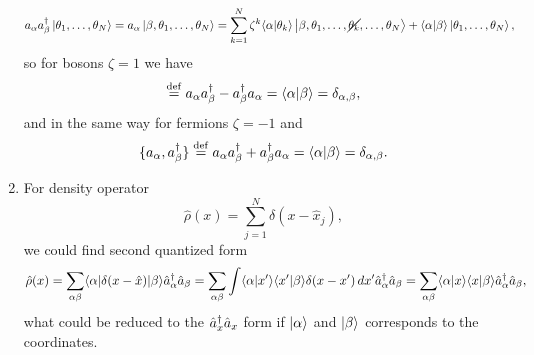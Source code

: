 \begin{enumerate}
\begin{align*}
		a_\alpha a_\beta\D \ket{\theta_1,\ldots,\theta_N} &= a_\alpha \ket{\beta,\theta_1,\ldots,\theta_N} = \sum_{k=1}^{N} \zeta^{k} \bk{\alpha}{\theta_k} \ket{\beta,\theta_1,\ldots,\cancel{\theta_k},\ldots,\theta_N} + \bk{\alpha}{\beta} \ket{\theta_1,\ldots,\theta_N},
	\end{align*}
	so for bosons $\zeta=1$ we have
	\begin{equation*}
		[a_\alpha, a_\beta\D] \overset{\mathrm{def}}{=} a_\alpha a_\beta\D - a_\beta\D a_\alpha = \bk{\alpha}{\beta} = \delta_{\alpha,\beta},
	\end{equation*}
	and in the same way for fermions $\zeta=-1$ and
	\begin{equation*}
		\{a_\alpha, a_\beta\D\} \overset{\mathrm{def}}{=} a_\alpha a_\beta\D + a_\beta\D a_\alpha = \bk{\alpha}{\beta} = \delta_{\alpha,\beta}.
	\end{equation*}
	\item For density operator 
	\begin{equation*}
		\hat{\rho}(x) = \sum_{j=1}^{N} \delta(x-\hat{x}_j),
	\end{equation*}
	we could find second quantized form
	\begin{equation*}
		\hat{\rho}(x) = \sum_{\alpha \beta} \bk{\alpha}[\delta(x-\hat{x})]{\beta} \hat{a}_\alpha\D \hat{a}_\beta = \sum_{\alpha \beta} \int
		\bk{\alpha}{x'} \bk{x'}{\beta} \delta(x-x') \d x' \hat{a}_\alpha\D \hat{a}_\beta = \sum_{\alpha \beta} \bk{\alpha}{x} \bk{x}{\beta} \hat{a}_\alpha\D \hat{a}_\beta,
	\end{equation*}
	what could be reduced to the $\hat{a}_x^{\dag} \hat{a}_x$ form if $\left| \alpha \right\rangle$ and $\left| \beta \right\rangle$ corresponds to the coordinates.
\end{enumerate}